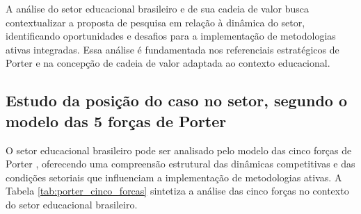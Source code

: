 A análise do setor educacional brasileiro e de sua cadeia de valor busca contextualizar a proposta de pesquisa em relação à dinâmica do setor, identificando oportunidades e desafios para a implementação de metodologias ativas integradas. Essa análise é fundamentada nos referenciais estratégicos de Porter e na concepção de cadeia de valor adaptada ao contexto educacional.

\subsection{Estudo da posição do caso no setor, segundo o modelo das 5 forças de Porter}
\label{subsec:porter}

O setor educacional brasileiro pode ser analisado pelo modelo das cinco forças de Porter \cite{PORTER1980}, oferecendo uma compreensão estrutural das dinâmicas competitivas e das condições setoriais que influenciam a implementação de metodologias ativas. A Tabela \ref{tab:porter_cinco_forcas} sintetiza a análise das cinco forças no contexto do setor educacional brasileiro.

